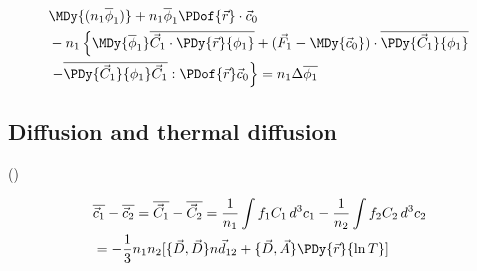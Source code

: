 \begin{refsection}
\begin{align*}
&\MDy{(n_1\overline{\phi}_1)}+n_1\overline{\phi}_1\PDof{\vec{r}}\cdot\vec{c}_0\\
&-n_1\left\{ \MDy{\overline{\phi}_1}\overline{\vec{C}_1\cdot\PDy{\vec{r}}{\phi_1}}+(\vec{F}_1-\MDy{\vec{c}_0})\cdot\overline{\PDy{\vec{C}_1}{\phi_1}}\right.\\
&\left.-\overline{\PDy{\vec{C}_1}{\phi_1}\vec{C}_1}:\PDof{\vec{r}}\vec{c}_0\right\}=n_1\Delta\overline{\phi_1}
\end{align*}


\subsection{Diffusion and thermal diffusion}
(\cite[pp. 143-144]{chapman52gas})

\begin{align*}
&\overline{\vec{c}_1}-\overline{\vec{c}_2}=\overline{\vec{C}_1}-\overline{\vec{C}_2}=\frac{1}{n_1}\int f_1C_1\,d^3c_1-\frac{1}{n_2}\int f_2C_2\,d^3c_2\\
&=-\frac{1}{3}n_1n_2[\{\vec{D},\vec{D}\}n\vec{d}_{12}+\{\vec{D},\vec{A}\}\PDy{\vec{r}}{\ln{T}}]
\end{align*}


\end{refsection}



